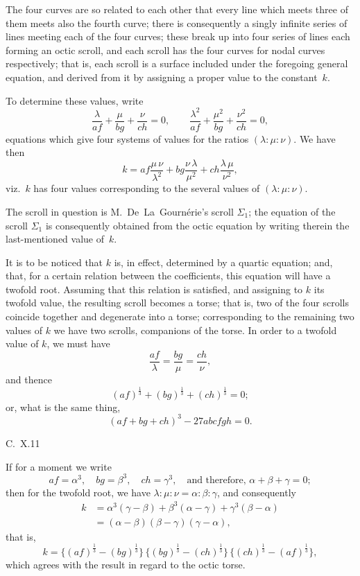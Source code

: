 \documentclass[11pt,a4paper]{book}
\begin{document}
The four curves are so related to each other that every line which meets three of them meets also the fourth curve; there is consequently a singly infinite series of lines meeting each of the four curves; these break up into four series of lines each forming an octic scroll, and each scroll has the four curves for nodal curves respectively; that is, each scroll is a surface included under the foregoing general equation, and derived from it by assigning a proper value to the constant~$k$.

To determine these values, write
\[
\frac{\lambda}{af} + \frac{\mu}{bg} + \frac{\nu}{ch} = 0, \qquad
\frac{\lambda^{2}}{af} + \frac{\mu^{2}}{bg} + \frac{\nu^{2}}{ch} = 0,
\]
equations which give four systems of values for the ratios $(\lambda : \mu : \nu)$. We have then
\[
k = af \frac{\mu\,\nu}{\lambda^{2}} + bg \frac{\nu\,\lambda}{\mu^{2}} + ch \frac{\lambda\,\mu}{\nu^{2}},
\]
viz.~$k$ has four values corresponding to the several values of $(\lambda : \mu : \nu)$.

The scroll in question is M.~De~La~Gourn\'{e}rie's scroll $\Sigma_{1}$; the equation of the scroll $\Sigma_{1}$ is consequently obtained from the octic equation by writing therein the last-mentioned value of~$k$.

It is to be noticed that $k$ is, in effect, determined by a quartic equation; and, that, for a certain relation between the coefficients, this equation will have a twofold root. Assuming that this relation is satisfied, and assigning to $k$ its twofold value, the resulting scroll becomes a torse; that is, two of the four scrolls coincide together and degenerate into a torse; corresponding to the remaining two values of $k$ we have two scrolls, companions of the torse. In order to a twofold value of $k$, we must have
\[
\frac{af}{\lambda} = \frac{bg}{\mu} = \frac{ch}{\nu},
\]
and thence
\[
(af)^{\frac{1}{3}} + (bg)^{\frac{1}{3}} + (ch)^{\frac{1}{3}} = 0;
\]
or, what is the same thing,
\[
(af + bg + ch)^{3} - 27abcfgh = 0.
\]

\medskip\noindent\textsc{C.~X.}\hfill 11

\newpage
\setcounter{page}{102}

If for a moment we write
\[
af = \alpha^{3}, \quad bg = \beta^{3}, \quad ch = \gamma^{3}, \quad \text{and therefore, } \alpha + \beta + \gamma = 0;
\]
then for the twofold root, we have $\lambda : \mu : \nu = \alpha : \beta : \gamma$, and consequently
\begin{align*}
k &= \alpha^{3}(\gamma - \beta) + \beta^{3}(\alpha - \gamma) + \gamma^{3}(\beta - \alpha) \\
&= (\alpha - \beta)(\beta - \gamma)(\gamma - \alpha),
\end{align*}
that is,
\[
k = \{(af)^{\frac{1}{3}} - (bg)^{\frac{1}{3}}\}\,\{(bg)^{\frac{1}{3}} - (ch)^{\frac{1}{3}}\}\,\{(ch)^{\frac{1}{3}} - (af)^{\frac{1}{3}}\},
\]
which agrees with the result in regard to the octic torse.
\end{document}
